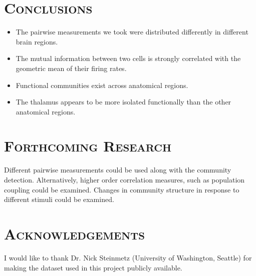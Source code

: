 \documentclass[a0,portrait]{a0poster}
\begin{document}
\begin{multicols}{2}

\section*{\color{NavyBlue}\textsc{Conclusions}\color{Black}}

\begin{itemize}
  \item The pairwise measurements we took were distributed differently in different brain regions.
  \item The mutual information between two cells is strongly correlated with the geometric mean of their firing rates.
  \item Functional communities exist across anatomical regions.
  \item The thalamus appears to be more isolated functionally than the other anatomical regions.
\end{itemize}


\section*{\color{NavyBlue}\textsc{Forthcoming Research}\color{Black}}

Different pairwise measurements could be used along with the community detection. Alternatively, higher order correlation measures, such as population coupling could be examined. Changes in community structure in response to different stimuli could be examined.


\section*{\color{NavyBlue}\textsc{Acknowledgements}\color{Black}}

I would like to thank Dr. Nick Steinmetz (University of Washington, Seattle) for making the dataset used in this project publicly available.




\end{multicols}
\end{document}
